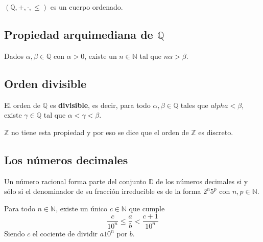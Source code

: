 $(\mathbb{Q},+,\cdot,\leq)$ es un cuerpo ordenado.

\subsection{Propiedad arquimediana de $\mathbb{Q}$}

Dados $\alpha,\beta \in \mathbb{Q}$ con $\alpha > 0 $, existe un $n \in \mathbb{N}$ tal que $n\alpha > \beta$.

\subsection{Orden divisible}

El orden de $\mathbb{Q}$ es \textbf{divisible}, es decir, para todo $\alpha,\beta \in \mathbb{Q}$ tales que $alpha < \beta$, existe $\gamma \in \mathbb{Q}$ tal que $\alpha < \gamma < \beta$.

$\mathbb{Z}$ no tiene esta propiedad y  por eso se dice que el orden de $\mathbb{Z}$ es discreto.

\subsection{Los números decimales}

Un número racional forma parte del conjunto $\mathbb{D}$ de los números decimales si y sólo si el denominador de su fracción irreducible es de la forma $2^n5^p$ con $n,p \in \mathbb{N}$.

Para todo $n \in \mathbb{N}$, existe un único $c \in \mathbb{N}$ que cumple
\[
\frac{c}{10^n} \leq \frac{a}{b} < \frac{c+1}{10^n}
\]
Siendo $c$ el cociente de dividir $a10^n$ por $b$.